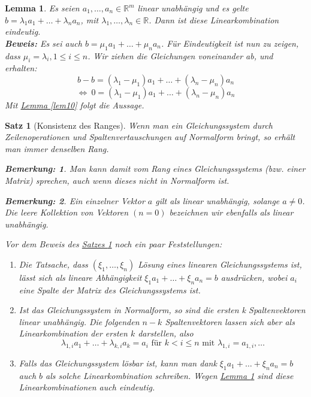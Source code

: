 \documentclass{report}
\newcommand{\lb}{\lambda}
\newcommand{\R}{\mathbb{R}}
\theoremstyle{customrem}
\newtheorem*{bemerkung}{Bemerkung\textnormal:}
\theoremstyle{customdef}
\newtheorem{lemma}[definition]{Lemma}
\newtheorem{satz}[definition]{Satz}
\begin{document}
	\begin{lemma}
		\label{lem11}
		Es seien \(a_1, \dots, a_n \in \R^m\)  linear unabhängig und es gelte \(b = \lb_1a_1 + \dots + \lb_n a_n\), mit \(\lb_1, \dots, \lb_n \in \R\). Dann ist diese Linearkombination eindeutig.\\
		\textbf{Beweis:} Es sei auch \(b = \mu_1 a_1 + \dots + \mu_n a_n\). Für Eindeutigkeit ist nun zu zeigen, dass \(\mu_i = \lb_i, 1 \le i \le n\).
		Wir ziehen die Gleichungen voneinander ab, und erhalten:
		\[
		b - b= (\lb_1 - \mu_1) a_1 + \ldots + (\lb_n - \mu_n) a_n\]\[
		\iff \ 0 = (\lb_1 - \mu_1) a_1 + \ldots + (\lb_n - \mu_n) a_n
		\]
		Mit \hyperref[lem10]{Lemma \ref*{lem10}} folgt die Aussage.
	\end{lemma}
	
	\begin{satz}[Konsistenz des Ranges]
		\label{satz12}
		Wenn man ein Gleichungssystem durch Zeilenoperationen und Spaltenvertauschungen auf Normalform bringt, so erhält man immer denselben Rang.		
		\begin{bemerkung}
			Man kann damit vom Rang eines Gleichungssystems (bzw. einer Matrix) sprechen, auch wenn dieses nicht in Normalform ist.
		\end{bemerkung}
		\begin{bemerkung}
			Ein einzelner Vektor \(a\) gilt als linear unabhängig, solange \(a \neq 0\). Die leere Kollektion von Vektoren \((n=0)\) bezeichnen wir ebenfalls als linear unabhängig.
		\end{bemerkung}
		 Vor dem Beweis des \hyperref[satz12]{Satzes \ref*{satz12}} noch ein paar Feststellungen:
		\begin{enumerate}
			\item Die Tatsache, dass \((\xi_1, \dots, \xi_n)\) Lösung eines linearen Gleichungssystems ist, lässt sich als lineare Abhängigkeit 
			\(\xi_1a_1 + \dots + \xi_n a_n = b\) ausdrücken, wobei \(a_i\) eine Spalte der Matrix des Gleichungssystems ist.
			\item Ist das Gleichungssystem in Normalform, so sind die ersten k Spaltenvektoren linear unabhängig. Die folgenden \(n-k\) Spaltenvektoren lassen sich aber als Linearkombination der ersten \(k\) darstellen, also
			\[
			\lb_{1,i}a_1 + \dots + \lb_{k,i}a_k = a_i \text{ für } k < i \le n
			\text{ mit }  \lb_{1,i} = a_{1,i}, \dots
			\]
			\item Falls das Gleichungssystem lösbar ist, kann man dank \(\xi_1a_1 + \dots + \xi_n a_n = b\) auch \(b\) als solche Linearkombination schreiben. Wegen \hyperref[lem11]{Lemma \ref*{lem11}} sind diese Linearkombinationen auch eindeutig.

\end{enumerate}
\end{satz}
\end{document}

